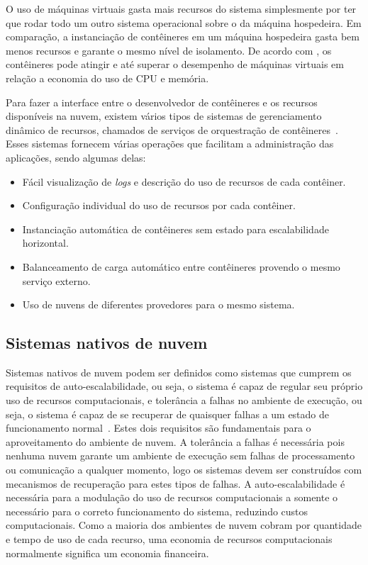 O uso de máquinas virtuais gasta mais recursos do sistema simplesmente por ter que rodar todo um outro sistema operacional sobre o da máquina hospedeira. Em comparação, a instanciação de contêineres em um máquina hospedeira gasta bem menos recursos e garante o mesmo nível de isolamento. De acordo com  \cite{7095802}, os contêineres pode atingir e até superar o desempenho de máquinas virtuais em relação a economia do uso de CPU e memória. %

Para fazer a interface entre o desenvolvedor de contêineres e os recursos disponíveis na nuvem, existem vários tipos de sistemas de gerenciamento dinâmico de recursos, chamados de serviços de orquestração de contêineres~\citep{Kubernetes,Mesos,Swarm}. Esses sistemas fornecem várias operações que facilitam a administração das aplicações, sendo algumas delas:
\begin{itemize}
    \item Fácil visualização de \textit{logs} e descrição do uso de recursos de cada contêiner.
    \item Configuração individual do uso de recursos por cada contêiner.
    \item Instanciação automática de contêineres sem estado para escalabilidade horizontal.
    \item Balanceamento de carga automático %
    entre contêineres provendo o mesmo serviço externo.
    \item Uso de nuvens de diferentes provedores para o mesmo sistema.
\end{itemize}




\subsection{Sistemas nativos de nuvem}
\label{sec:cloud-native-systems}
Sistemas nativos de nuvem podem ser definidos como sistemas que cumprem os  requisitos de auto-escalabilidade, ou seja, o sistema é capaz de regular seu próprio uso de recursos computacionais, e tolerância a falhas no ambiente de execução, ou seja, o sistema é capaz de se recuperar de quaisquer falhas a um estado de funcionamento normal~\citep{garrison2017cloud,gilbert2018cloud}. Estes dois requisitos são fundamentais para o aproveitamento do ambiente de nuvem. A tolerância a falhas é necessária pois nenhuma nuvem garante um ambiente de execução sem falhas de processamento ou comunicação a qualquer momento, logo os sistemas devem ser construídos com mecanismos de recuperação para estes tipos de falhas. A auto-escalabilidade é necessária para a modulação do uso de recursos computacionais a somente o necessário para o correto funcionamento do sistema, reduzindo custos computacionais. Como a maioria dos ambientes de nuvem cobram por quantidade e tempo de uso de cada recurso, uma economia de recursos computacionais normalmente significa um economia financeira.

